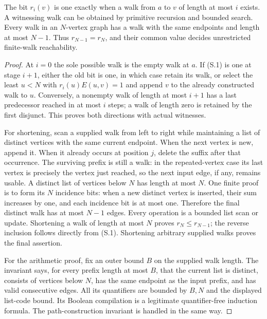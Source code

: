 \begin{theorem}
\label{thm:S01}
The bit $r_i(v)$ is one exactly when a walk from $a$ to $v$ of length at
most $i$ exists.  A witnessing walk can be obtained by primitive recursion
and bounded search.  Every walk in an $N$-vertex graph has a walk with the
same endpoints and length at most $N-1$.  Thus $r_{N-1}=r_N$, and their
common value decides unrestricted finite-walk reachability.
\end{theorem}
\begin{proof}
At $i=0$ the sole possible walk is the empty walk at $a$.  If (S.1) is
one at stage $i+1$, either the old bit is one, in which case retain its
walk, or select the least $u<N$ with $r_i(u)E(u,v)=1$ and append $v$ to
the already constructed walk to $u$.  Conversely, a nonempty walk of
length at most $i+1$ has a last predecessor reached in at most $i$
steps; a walk of length zero is retained by the first disjunct.  This
proves both directions with actual witnesses.

For shortening, scan a supplied walk from left to right while maintaining
a list of distinct vertices with the same current endpoint.  When the
next vertex is new, append it.  When it already occurs at position $j$,
delete the suffix after that occurrence.  The surviving prefix is still a
walk: in the repeated-vertex case its last vertex is precisely the vertex
just reached, so the next input edge, if any, remains usable.  A distinct
list of vertices below $N$ has length at most $N$.  One finite proof is to
form its $N$ incidence bits: when a new distinct vertex is inserted, their
sum increases by one, and each incidence bit is at most one.  Therefore
the final distinct walk has at most $N-1$ edges.  Every operation is a
bounded list scan or update.  Shortening a walk of length at most $N$
proves $r_N\leq r_{N-1}$; the reverse inclusion follows directly from
(S.1).  Shortening arbitrary supplied walks proves the final assertion.

For the arithmetic proof, fix an outer bound $B$ on the supplied walk
length.  The invariant says, for every prefix length at most $B$, that
the current list is distinct, consists of vertices below $N$, has the
same endpoint as the input prefix, and has valid consecutive edges.  All
its quantifiers are bounded by $B,N$ and the displayed list-code bound.
Its Boolean compilation is a legitimate quantifier-free induction
formula.  The path-construction invariant is handled in the same way.
\end{proof}

